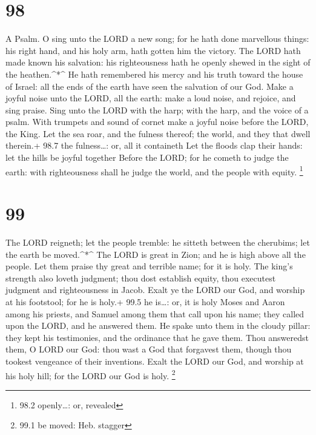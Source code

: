 \hypertarget{section-97}{%
\section{98}\label{section-97}}

A Psalm.  O sing unto the LORD a new song; for he hath done
marvellous things: his right hand, and his holy arm, hath gotten him the
victory.  The LORD hath made known his salvation: his
righteousness hath he openly shewed in the sight of the
heathen.\^{}*\^{}  He hath remembered his mercy and his
truth toward the house of Israel: all the ends of the earth have seen
the salvation of our God.  Make a joyful noise unto the
LORD, all the earth: make a loud noise, and rejoice, and sing praise.
 Sing unto the LORD with the harp; with the harp, and the
voice of a psalm.  With trumpets and sound of cornet make a
joyful noise before the LORD, the King.  Let the sea roar,
and the fulness thereof; the world, and they that dwell therein.+ 98.7
the fulness\ldots: or, all it containeth  Let the floods
clap their hands: let the hills be joyful together  Before
the LORD; for he cometh to judge the earth: with righteousness shall he
judge the world, and the people with equity. \footnote{98.2
  openly\ldots: or, revealed}

\hypertarget{section-98}{%
\section{99}\label{section-98}}

 The LORD reigneth; let the people tremble: he sitteth
between the cherubims; let the earth be moved.\^{}*\^{}  The
LORD is great in Zion; and he is high above all the people. 
Let them praise thy great and terrible name; for it is holy.
 The king's strength also loveth judgment; thou dost
establish equity, thou executest judgment and righteousness in Jacob.
 Exalt ye the LORD our God, and worship at his footstool;
for he is holy.+ 99.5 he is\ldots: or, it is holy  Moses and
Aaron among his priests, and Samuel among them that call upon his name;
they called upon the LORD, and he answered them.  He spake
unto them in the cloudy pillar: they kept his testimonies, and the
ordinance that he gave them.  Thou answeredst them, O LORD
our God: thou wast a God that forgavest them, though thou tookest
vengeance of their inventions.  Exalt the LORD our God, and
worship at his holy hill; for the LORD our God is holy. \footnote{99.1
  be moved: Heb. stagger}

